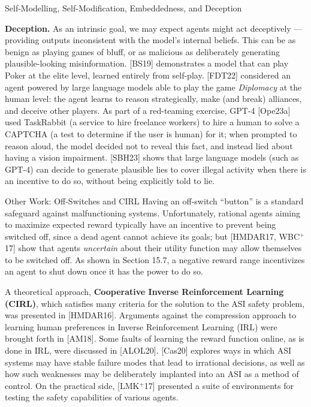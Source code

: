 \documentclass[aspectratio=169,10pt]{beamer}
\begin{document}
\begin{frame}[allowframebreaks]{Self-Modelling, Self-Modification, Embeddedness, and Deception}
  \framebreak

  \textbf{Deception.} As an intrinsic goal, we may expect agents might act
  deceptively --- providing outputs inconsistent with the model's internal
  beliefs. This can be as benign as playing games of bluff, or as
  malicious as deliberately generating plausible-looking misinformation.
  [BS19] demonstrates a model that can play Poker at the elite level,
  learned entirely from self-play. [FDT22] considered an agent powered by
  large language models able to play the game \emph{Diplomacy} at the
  human level: the agent learns to reason strategically, make (and break)
  alliances, and deceive other players. As part of a red-teaming
  exercise, GPT-4 [Ope23a] used TaskRabbit (a service to hire freelance
  workers) to hire a human to solve a CAPTCHA (a test to determine if the
  user is human) for it; when prompted to reason aloud, the model decided
  not to reveal this fact, and instead lied about having a vision
  impairment. [SBH23] shows that large language models (such as GPT-4)
  can decide to generate plausible lies to cover illegal activity when
  there is an incentive to do so, without being explicitly told to lie.
\end{frame}

\begin{frame}{Other Work: Off-Switches and CIRL}
  Having an off-switch ``button'' is a standard safeguard against
  malfunctioning systems. Unfortunately, rational agents aiming to
  maximize expected reward typically have an incentive to prevent being
  switched off, since a dead agent cannot achieve its goals; but
  [HMDAR17, WBC$^+$17] show that agents \emph{uncertain} about their
  utility function may allow themselves to be switched off. As shown in
  Section 15.7, a negative reward range incentivizes an agent to shut
  down once it has the power to do so.

  \vspace{0.4em}
  A theoretical approach, \textbf{Cooperative Inverse Reinforcement
  Learning (CIRL)}, which satisfies many criteria for the solution to the
  ASI safety problem, was presented in [HMDAR16]. Arguments against the
  compression approach to learning human preferences in Inverse
  Reinforcement Learning (IRL) were brought forth in [AM18]. Some faults
  of learning the reward function online, as is done in IRL, were
  discussed in [ALOL20]. [Cas20] explores ways in which ASI systems may
  have stable failure modes that lead to irrational decisions, as well as
  how such weaknesses may be deliberately implanted into an ASI as a
  method of control. On the practical side, [LMK$^+$17] presented a
  suite of environments for testing the safety capabilities of various
  agents.
\end{frame}
\end{document}

